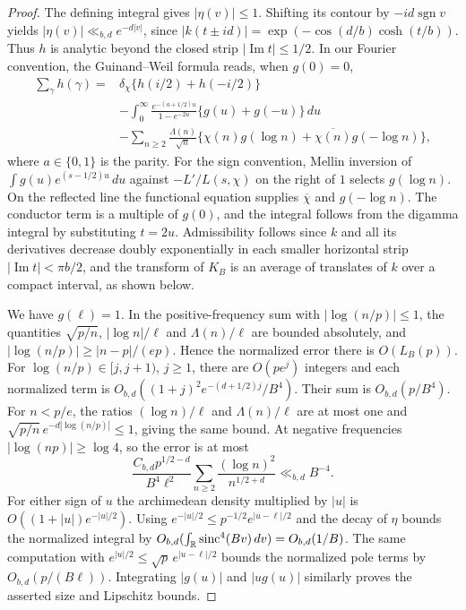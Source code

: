 \begin{proof}
The defining integral gives $|\eta(v)|\le1$. Shifting its contour by
$-id\operatorname{sgn} v$ yields $|\eta(v)|\ll_{b,d}e^{-d|v|}$, since
$|k(t\pm id)|=\exp(-\cos(d/b)\cosh(t/b))$. Thus $h$ is analytic beyond
the closed strip $|\operatorname{Im}t|\le1/2$. In our Fourier convention,
the Guinand--Weil formula \cite[Eqs.~(2.1) and (2.6)]{weil} reads, when $g(0)=0$,
\begin{align*}
 \sum_\gamma h(\gamma)={}&\delta_\chi\{h(i/2)+h(-i/2)\}\\
 &-\int_0^\infty \frac{e^{-(a+1/2)u}}{1-e^{-2u}}
                 \{g(u)+g(-u)\}\,du\\
 &-\sum_{n\ge2}\frac{\Lambda(n)}{\sqrt n}
            \{\chi(n)g(\log n)+\overline{\chi(n)}g(-\log n)\},
\end{align*}
where $a\in\{0,1\}$ is the parity. For the sign convention, Mellin inversion
of $\int g(u)e^{(s-1/2)u}\,du$ against $-L'/L(s,\chi)$ on the right of $1$
selects $g(\log n)$. On the reflected line the functional equation supplies
$\overline\chi$ and $g(-\log n)$. The conductor term is a multiple of
$g(0)$, and the integral follows from the digamma integral by substituting
$t=2u$. Admissibility follows since $k$ and all its derivatives decrease
doubly exponentially in each smaller horizontal strip
$|\operatorname{Im}t|<\pi b/2$, and the transform of $K_B$ is an average of
translates of $k$ over a compact interval, as shown below.

We have $g(\ell)=1$. In the positive-frequency sum with
$|\log(n/p)|\le1$, the quantities $\sqrt{p/n}$, $|\log n|/\ell$ and
$\Lambda(n)/\ell$ are bounded absolutely, and
$|\log(n/p)|\ge |n-p|/(ep)$. Hence the normalized error there is
$O(L_B(p))$. For
$\log(n/p)\in[j,j+1)$, $j\ge1$, there are $O(pe^j)$ integers and each
normalized term is
$O_{b,d}((1+j)^2 e^{-(d+1/2)j}/B^4)$. Their sum is $O_{b,d}(p/B^4)$.
For $n<p/e$, the ratios $(\log n)/\ell$ and $\Lambda(n)/\ell$ are at most
one and $\sqrt{p/n}\,e^{-d|\log(n/p)|}\le1$, giving the same bound.
At negative frequencies $|\log(np)|\ge\log4$, so the error is at most
\[
 \frac{C_{b,d}p^{1/2-d}}{B^4\ell^2}
       \sum_{n\ge2}\frac{(\log n)^2}{n^{1/2+d}}\ll_{b,d}B^{-4}.
\]
For either sign of $u$ the archimedean density multiplied by $|u|$ is
$O((1+|u|)e^{-|u|/2})$. Using
$e^{-|u|/2}\le p^{-1/2}e^{|u-\ell|/2}$ and the decay of $\eta$ bounds
the normalized integral by $O_{b,d}(\int_\mathbb R\operatorname{sinc}^4(Bv)\,dv)=O_{b,d}(1/B)$.
The same computation with $e^{|u|/2}\le\sqrt p\,e^{|u-\ell|/2}$ bounds
the normalized pole terms by $O_{b,d}(p/(B\ell))$. Integrating $|g(u)|$ and
$|ug(u)|$ similarly proves the asserted size and Lipschitz bounds.


\end{proof}
